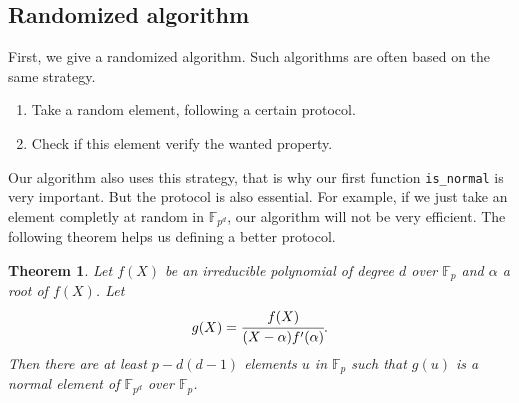 \documentclass[a4paper,11pt]{article}
\theoremstyle{break}
\newtheorem{thm}{Theorem}[section]
\theoremstyle{sc}
\theoremstyle{definition}
\theoremstyle{remark}
\begin{document}
\subsection{Randomized algorithm}
First, we give a randomized algorithm. Such algorithms are often based on the
same strategy.
\begin{enumerate}
  \item Take a random element, following a certain protocol.
  \item Check if this element verify the wanted property.
\end{enumerate}
Our algorithm also uses this strategy, that is why our first function
\texttt{is\_normal} is very important. But the protocol is also essential.
For example, if we just take an element completly at random in
$\mathbb{F}_{p^d}$, our algorithm will not be very efficient. The following
theorem helps us defining a better protocol.
\begin{thm}
  Let $f(X)$ be an irreducible polynomial of degree $d$ over
  $\mathbb{F}_p$ and $\alpha$ a root of $f(X)$. Let
  \[
    g(X)=\cfrac{f(X)}{(X-\alpha)f'(\alpha)}.
  \]
  Then there are at least $p -d(d-1)$ elements $u$ in $\mathbb{F}_p$ such that
  $g(u)$ is a normal element of $\mathbb{F}_{p^d}$ over $\mathbb{F}_p$.
\end{thm}
\end{document}
